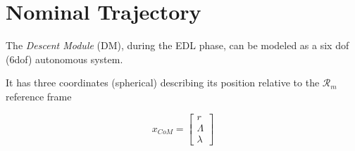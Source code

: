 \chapter{Nominal Trajectory}

The \textit{Descent Module} (DM), during the EDL phase, can be modeled as a
six dof (6dof) autonomous system.

It has three coordinates (spherical) describing its position relative to the
$\mathcal{R}_{m}$ reference frame

$$ x_{CoM} = \begin{bmatrix}
    r \\
    \Lambda \\
    \lambda
\end{bmatrix}$$